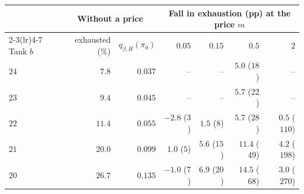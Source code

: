 \begin{tabular}{lrrrrrr}
\toprule
 & \multicolumn{2}{c}{Without a price} & \multicolumn{4}{c}{Fall in exhaustion (pp) at the price $m$} \\
\cmidrule(lr){2-3}\cmidrule(lr){4-7}
Tank $b$ & exhausted (\%) & $q_{\beta,H}(\pi_0)$ & $0.05$ & $0.15$ & $0.5$ & $2$ \\
\midrule
$24$ & $7.8$ & $0.037$ & -- & -- & $5.0$ ($18$) & -- \\
$23$ & $9.4$ & $0.045$ & -- & -- & $5.7$ ($22$) & -- \\
$22$ & $11.4$ & $0.055$ & $-2.8$ ($3$) & $1.5$ ($8$) & $5.7$ ($28$) & $0.5$ ($110$) \\
$21$ & $20.0$ & $0.099$ & $1.0$ ($5$) & $5.6$ ($15$) & $11.4$ ($49$) & $4.2$ ($198$) \\
$20$ & $26.7$ & $0.135$ & $-1.0$ ($7$) & $6.9$ ($20$) & $14.5$ ($68$) & $3.0$ ($270$) \\
\bottomrule
\end{tabular}
